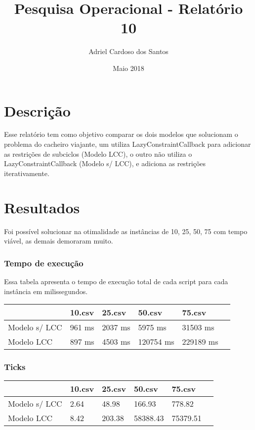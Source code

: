 \documentclass{article}
\title{Pesquisa Operacional - Relatório 10}
\author{Adriel Cardoso dos Santos}
\date{Maio 2018}
\begin{document}
    \maketitle

    \section{Descrição}

    Esse relatório tem como objetivo comparar os dois modelos que solucionam o problema do cacheiro viajante, um utiliza LazyConstraintCallback
    para adicionar as restrições de subciclos (Modelo LCC), o outro não utiliza o LazyConstraintCallback (Modelo s/ LCC), e adiciona as restrições iterativamente.

    \section{Resultados}

    Foi possível solucionar na otimalidade as instâncias de 10, 25, 50, 75 com tempo viável, as demais demoraram muito.

    \subsubsection{Tempo de execução}
    Essa tabela apresenta o tempo de execução total de cada script para cada instância em milissegundos.
    \begin{center}
        \begin{tabular}{ | l | l | l | l | l | p{5cm} |}
            \hline
            & 10.csv & 25.csv & 50.csv & 75.csv \\ \hline
            Modelo s/ LCC & 961 ms & 2037 ms & 5975 ms & 31503 ms\\
            Modelo LCC & 897 ms & 4503 ms & 120754 ms & 229189 ms\\
            \hline
        \end{tabular}
    \end{center}

    \subsubsection{Ticks}

    \begin{center}
        \begin{tabular}{ | l | l | l | l | l | p{5cm} |}
            \hline
            & 10.csv & 25.csv & 50.csv & 75.csv \\ \hline
            Modelo s/ LCC & 2.64 & 48.98 & 166.93 & 778.82\\
            Modelo LCC & 8.42 & 203.38 & 58388.43 & 75379.51\\
            \hline
        \end{tabular}
    \end{center}
\end{document}
